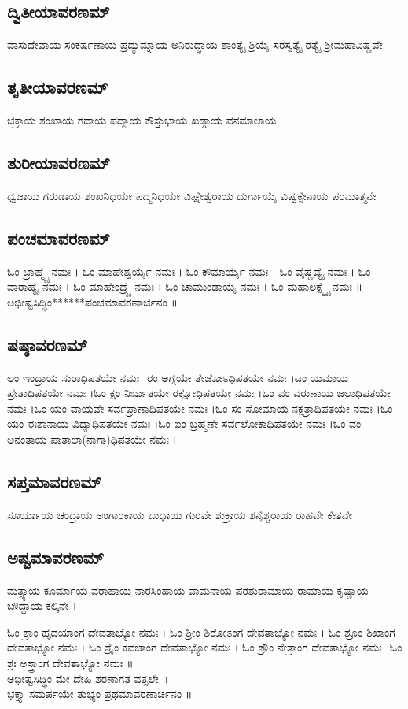 \subsection{ದ್ವಿತೀಯಾವರಣಮ್}
ವಾಸುದೇವಾಯ ಸಂಕರ್ಷಣಾಯ ಪ್ರದ್ಯುಮ್ನಾಯ ಅನಿರುದ್ಧಾಯ ಶಾಂತ್ಯೈ ಶ್ರಿಯೈ ಸರಸ್ವತ್ಯೈ ರತ್ಯೈ ಶ್ರೀಮಹಾವಿಷ್ಣವೇ

\subsection{ತೃತೀಯಾವರಣಮ್}
ಚಕ್ರಾಯ ಶಂಖಾಯ ಗದಾಯ ಪದ್ಮಾಯ ಕೌಸ್ತುಭಾಯ ಖಡ್ಗಾಯ ವನಮಾಲಾಯ 

\subsection{ತುರೀಯಾವರಣಮ್}
ಧ್ವಜಾಯ ಗರುಡಾಯ ಶಂಖನಿಧಯೇ ಪದ್ಮನಿಧಯೇ ವಿಘ್ನೇಶ್ವರಾಯ ದುರ್ಗಾಯೈ ವಿಷ್ವಕ್ಸೇನಾಯ ಪರಮಾತ್ಮನೇ 

\subsection{ಪಂಚಮಾವರಣಮ್}
ಓಂ ಬ್ರಾಹ್ಮ್ಯೈ ನಮಃ । ಓಂ ಮಾಹೇಶ್ವರ್ಯೈ ನಮಃ । ಓಂ ಕೌಮಾರ್ಯೈ ನಮಃ । ಓಂ ವೈಷ್ಣವ್ಯೈ ನಮಃ । ಓಂ ವಾರಾಹ್ಯೈ ನಮಃ । ಓಂ ಮಾಹೇಂದ್ರ್ಯೈ ನಮಃ । ಓಂ ಚಾಮುಂಡಾಯೈ ನಮಃ । ಓಂ ಮಹಾಲಕ್ಷ್ಮ್ಯೈ ನಮಃ ॥\\
ಅಭೀಷ್ಟಸಿದ್ಧಿಂ******ಪಂಚಮಾವರಣಾರ್ಚನಂ ॥
\subsection{ಷಷ್ಠಾವರಣಮ್}
ಲಂ ಇಂದ್ರಾಯ ಸುರಾಧಿಪತಯೇ ನಮಃ ।ರಂ ಅಗ್ನಯೇ ತೇಜೋಽಧಿಪತಯೇ ನಮಃ ।ಟಂ ಯಮಾಯ ಪ್ರೇತಾಧಿಪತಯೇ ನಮಃ ।ಓಂ ಕ್ಷಂ ನಿರ್ಋತಯೇ ರಕ್ಷೋಧಿಪತಯೇ ನಮಃ ।ಓಂ ವಂ ವರುಣಾಯ ಜಲಾಧಿಪತಯೇ ನಮಃ ।ಓಂ ಯಂ ವಾಯವೇ ಸರ್ವಪ್ರಾಣಾಧಿಪತಯೇ ನಮಃ ।ಓಂ ಸಂ ಸೋಮಾಯ ನಕ್ಷತ್ರಾಧಿಪತಯೇ ನಮಃ ।ಓಂ ಯಂ ಈಶಾನಾಯ ವಿದ್ಯಾಧಿಪತಯೇ ನಮಃ ।ಓಂ ಐಂ ಬ್ರಹ್ಮಣೇ ಸರ್ವಲೋಕಾಧಿಪತಯೇ ನಮಃ ।ಓಂ ವಂ  ಅನಂತಾಯ ಪಾತಾಲಾ(ನಾಗಾ)ಧಿಪತಯೇ ನಮಃ ।
\subsection{ಸಪ್ತಮಾವರಣಮ್}
ಸೂರ್ಯಾಯ ಚಂದ್ರಾಯ ಅಂಗಾರಕಾಯ ಬುಧಾಯ ಗುರವೇ ಶುಕ್ರಾಯ ಶನೈಶ್ಚರಾಯ ರಾಹವೇ ಕೇತವೇ
\subsection{ಅಷ್ಟಮಾವರಣಮ್}
ಮತ್ಸ್ಯಾಯ ಕೂರ್ಮಾಯ ವರಾಹಾಯ ನಾರಸಿಂಹಾಯ ವಾಮನಾಯ ಪರಶುರಾಮಾಯ ರಾಮಾಯ ಕೃಷ್ಣಾಯ ಬೌದ್ಧಾಯ ಕಲ್ಕಿನೇ ।



ಓಂ ಶ್ರಾಂ ಹೃದಯಾಂಗ ದೇವತಾಭ್ಯೋ ನಮಃ । ಓಂ ಶ್ರೀಂ ಶಿರೋಽಂಗ ದೇವತಾಭ್ಯೋ ನಮಃ । ಓಂ ಶ್ರೂಂ ಶಿಖಾಂಗ ದೇವತಾಭ್ಯೋ ನಮಃ । ಓಂ ಶ್ರೈಂ ಕವಚಾಂಗ ದೇವತಾಭ್ಯೋ ನಮಃ । ಓಂ ಶ್ರೌಂ ನೇತ್ರಾಂಗ ದೇವತಾಭ್ಯೋ ನಮಃ। ಓಂ ಶ್ರಃ ಅಸ್ತ್ರಾಂಗ ದೇವತಾಭ್ಯೋ ನಮಃ ॥\\
ಅಭೀಷ್ಟಸಿದ್ಧಿಂ ಮೇ ದೇಹಿ ಶರಣಾಗತ ವತ್ಸಲೇ~।\\
ಭಕ್ತ್ಯಾ ಸಮರ್ಪಯೇ ತುಭ್ಯಂ ಪ್ರಥಮಾವರಣಾರ್ಚನಂ ॥


